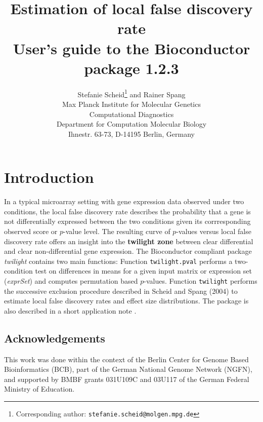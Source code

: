 \documentclass[11pt,a4paper,fleqn]{report}
\title{Estimation of local false discovery rate \bigskip \\ User's guide to the Bioconductor package \Rpackage{twilight} 1.2.3}
\author{Stefanie Scheid\footnote{Corresponding author: 
        \texttt{stefanie.scheid@molgen.mpg.de}}
        and Rainer Spang \bigskip \\
        \small Max Planck Institute for Molecular Genetics\\ 
         Computational Diagnostics\\ Department for Computation Molecular Biology \\
         Ihnestr. 63-73, D-14195 Berlin, Germany}
\date{}
\newcommand{\Rfunction}[1]{{\texttt{#1}}}
\newcommand{\Rpackage}[1]{{\textit{#1}}}
\newcommand{\Rclass}[1]{{\textit{#1}}}
\begin{document}
\maketitle



\chapter{Introduction}

In a typical microarray setting with gene expression data observed under two conditions, the local false discovery rate describes the probability that a gene is not differentially expressed between the two conditions given its corrresponding observed score or $p$-value level. The resulting curve of $p$-values versus local false discovery rate offers an insight into the \textbf{twilight zone} between clear differential and clear non-differential gene expression. The Bioconductor compliant package \Rpackage{twilight} contains two main functions: Function \Rfunction{twilight.pval} performs a two-condition test on differences in means for a given input matrix or expression set (\Rclass{exprSet}) and computes permutation based $p$-values. Function \Rfunction{twilight} performs the successive exclusion procedure described in Scheid and Spang (2004) \cite{scheid04} to estimate local false discovery rates and effect size distributions. The package is also described in a short application note \cite{scheid05}.



\section*{Acknowledgements}

This work was done within the context of the Berlin Center for Genome Based Bioinformatics (BCB), part of the German National Genome Network (NGFN), and supported by BMBF grants 031U109C and 03U117 of the German Federal Ministry of Education.



\end{document}

